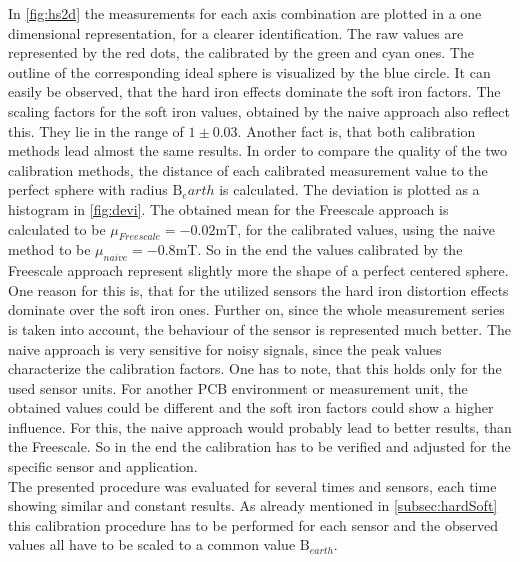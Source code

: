 In \ref{fig:hs2d} the measurements for each axis combination are plotted in a one dimensional representation, for a clearer identification. The raw values are represented by the red dots, the calibrated by the green and cyan ones. The outline of the corresponding ideal sphere is visualized by the blue circle. It can easily be observed, that the hard iron effects dominate the soft iron factors. The scaling factors for the soft iron values, obtained by the naive approach also reflect this. They lie in the range of $ 1 \pm 0.03 $. Another fact is, that both calibration methods lead almost the same results. In order to compare the quality of the two calibration methods, the distance of each calibrated measurement value to the perfect sphere with radius $ \mathrm{B}_earth $ is calculated. The deviation is plotted as a histogram in \ref{fig:devi}. The obtained mean for the Freescale approach is calculated to be $ \mu_{Freescale} = -0.02\si{\milli \tesla} $, for the calibrated values, using the naive method to be $ \mu_{naive} = -0.8\si{\milli \tesla} $. So in the end the values calibrated by the Freescale approach represent slightly more the shape of a perfect centered sphere. One reason for this is, that for the utilized sensors the hard iron distortion effects dominate over the soft iron ones. Further on, since the whole measurement series is taken into account, the behaviour of the sensor is represented much better. The naive approach is very sensitive for noisy signals, since the peak values characterize the calibration factors. One has to note, that this holds only for the used sensor units. For another \ac{PCB} environment or measurement unit, the obtained values could be different and the soft iron factors could show a higher influence. For this, the naive approach would probably lead to better results, than the Freescale. So in the end the calibration has to be verified and adjusted for the specific sensor and application.\\
The presented procedure was evaluated for several times and sensors, each time showing similar and constant results. As already mentioned in \ref{subsec:hardSoft} this calibration procedure has to be performed for each sensor and the observed values all have to be scaled to a common value $ \mathrm{B}_{earth} $.



